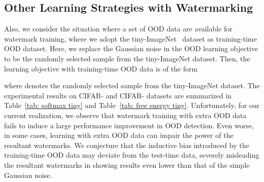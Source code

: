 \documentclass{article}
\begin{document}
\subsection{Other Learning Strategies with Watermarking}

Also, we consider the situation where a set of OOD data are available for watermark training, where we adopt the tiny-ImageNet~\cite{le2015tiny} dataset as training-time OOD dataset. Here, we replace the Gaussian noise in the OOD learning objective  to be the randomly selected sample from the tiny-ImageNet dataset. Then, the learning objective with training-time OOD data is of the form

where  denotes the randomly selected sample from the tiny-ImageNet dataset. The experimental results on CIFAR- and CIFAR- datasets are summarized in Table~\ref{tab: softmax tiny} and Table~\ref{tab: free energy tiny}. Unfortunately, for our current realization, we observe that watermark training with extra OOD data fails to induce a large performance improvement in OOD detection. Even worse, in some cases, learning with extra OOD data can impair the power of the resultant watermarks. We conjecture that the inductive bias introduced by the training-time OOD data may deviate from the test-time data, severely misleading the resultant watermarks in showing results even lower than that of the simple Gaussian noise.  
\end{document}
